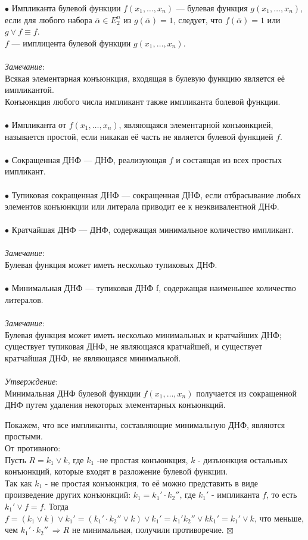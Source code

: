 \documentclass[a4paper, 12pt]{report}
\newenvironment{Proof} %
{\par\noindent{$\blacklozenge$}} %
{\hfill$\scriptstyle\boxtimes$} %
\begin{document}
$\bullet$
Импликанта булевой функции $f(x_1,\dotso,x_n)$ — булевая функция $g(x_1,\dotso,x_n)$, если для любого набора $\bar \alpha \in E^n_2$ из $g(\bar \alpha)=1$, следует, что $f(\bar \alpha)=1$ или $g\vee f \equiv f$.\\
$f$ — имплицента булевой функции $g(x_1,\dotso,x_n)$.\\\\
\textit{Замечание}:\\
Всякая элементарная конъюнкция, входящая в булевую функцию является её импликантой.\\
Конъюнкция любого числа импликант также импликанта болевой функции.\\\\
$\bullet$
Импликанта от $f(x_1,\dotso,x_n)$, являющаяся элементарной конъюнкцией, называется простой, если никакая её часть не является булевой функцией $f$.\\\\
$\bullet$
Сокращенная ДНФ — ДНФ, реализующая $f$ и состаящая из всех простых импликант. \\\\
$\bullet$
Тупиковая сокращенная ДНФ — сокращенная ДНФ, если отбрасывание любых элементов конъюнкции или литерала приводит ее к неэквивалентной ДНФ.\\\\
$\bullet$
Кратчайшая ДНФ — ДНФ, содержащая минимальное количество импликант.\\\\
\textit{Замечание}:\\
Булевая функция может иметь несколько тупиковых ДНФ.\\\\
$\bullet$
Минимальная ДНФ — тупиковая ДНФ f, содержащая наименьшее количество литералов.\\\\
\textit{Замечание}:\\
Булевая функция может иметь несколько минимальных и кратчайших ДНФ; существует тупиковая ДНФ, не являющаяся кратчайшей, и существует кратчайшая ДНФ, не являющаяся минимальной.\\\\
\textit{Утверждение}:\\
Минимальная ДНФ булевой функции $f(x_1,\dotso,x_n)$ получается из сокращенной ДНФ путем удаления некоторых элементарных конъюнкций.\\
\begin{Proof}
	Покажем, что все импликанты, составляющие минимальную ДНФ, являются простыми.\\
	От противного:\\
	Пусть $R=k_1\vee k$, где $k_1$ -не простая конъюнкция, $k$ - дизъюнкция остальных конъюнкций, которые входят в разложение булевой функции.\\
	Так как $k_1$ - не простая конъюнкция, то её можно представить в виде произведение других конъюнкций: $k_1 = k_1' \cdot k_2''$, где $k_1'$ - импликанта $f$, то есть $k_1' \vee f = f$. Тогда $f = (k_1\vee k)\vee k_1' = ( k_1' \cdot k_2'' \vee k)\vee k_1' = k_1'k_2'' \vee k k_1' = k_1' \vee k$, что меньше, чем $k_1'\cdot k_2'' ~ \Rightarrow R$ не минимальная, получили противоречие.
\end{Proof}\\
\end{document}
